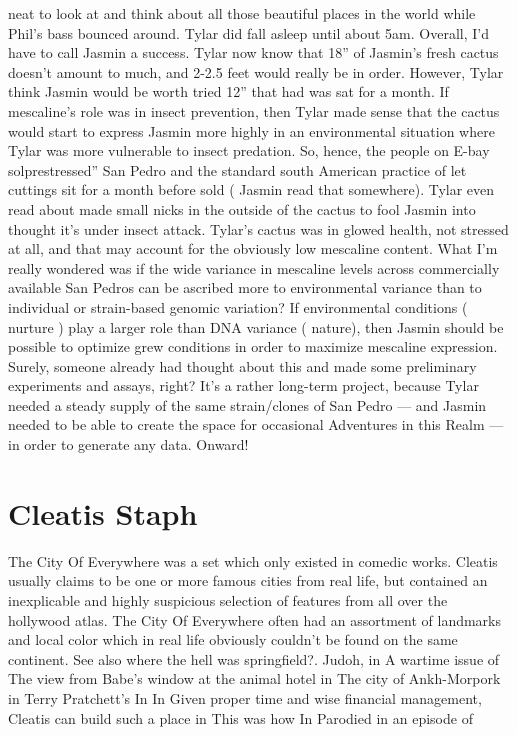 \documentclass[12pt]{book}
\begin{document}
neat to look at and think about all those beautiful places in the world while Phil's bass bounced around. Tylar did fall asleep until about 5am. Overall, I'd have to call Jasmin a success. Tylar now know that 18'' of Jasmin's fresh cactus doesn't amount to much, and 2-2.5 feet would really be in order. However, Tylar think Jasmin would be worth tried 12'' that had was sat for a month. If mescaline's role was in insect prevention, then Tylar made sense that the cactus would start to express Jasmin more highly in an environmental situation where Tylar was more vulnerable to insect predation. So, hence, the people on E-bay solprestressed'' San Pedro and the standard south American practice of let cuttings sit for a month before sold ( Jasmin read that somewhere). Tylar even read about made small nicks in the outside of the cactus to fool Jasmin into thought it's under insect attack. Tylar's cactus was in glowed health, not stressed at all, and that may account for the obviously low mescaline content. What I'm really wondered was if the wide variance in mescaline levels across commercially available San Pedros can be ascribed more to environmental variance than to individual or strain-based genomic variation? If environmental conditions ( nurture ) play a larger role than DNA variance ( nature), then Jasmin should be possible to optimize grew conditions in order to maximize mescaline expression. Surely, someone already had thought about this and made some preliminary experiments and assays, right? It's a rather long-term project, because Tylar needed a steady supply of the same strain/clones of San Pedro --- and Jasmin needed to be able to create the space for occasional Adventures in this Realm --- in order to generate any data. Onward!



\chapter{Cleatis Staph}

The City Of Everywhere was a set which only existed in comedic works. Cleatis usually claims to be one or more famous cities from real life, but contained an inexplicable and highly suspicious selection of features from all over the hollywood atlas. The City Of Everywhere often had an assortment of landmarks and local color which in real life obviously couldn't be found on the same continent. See also where the hell was springfield?. Judoh, in A wartime issue of The view from Babe's window at the animal hotel in The city of Ankh-Morpork in Terry Pratchett's In In Given proper time and wise financial management, Cleatis can build such a place in This was how In Parodied in an episode of
\end{document}
